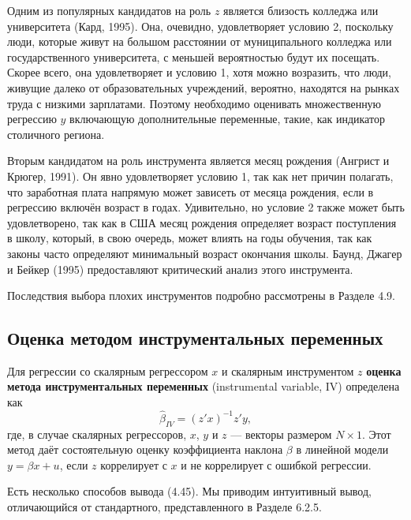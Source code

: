 Одним из популярных кандидатов на роль $z$ является близость колледжа или университета (Кард, 1995). Она, очевидно, удовлетворяет условию 2, поскольку люди, которые живут на большом расстоянии от муниципального колледжа или государственного университета, с меньшей вероятностью будут их посещать. Скорее всего, она удовлетворяет и условию 1, хотя можно возразить, что люди, живущие далеко от образовательных учреждений, вероятно, находятся на рынках труда с низкими зарплатами. Поэтому необходимо оценивать множественную регрессию $y$ включающую дополнительные переменные, такие, как индикатор столичного региона.

Вторым кандидатом на роль инструмента является месяц рождения (Ангрист и Крюгер, 1991). Он явно удовлетворяет условию 1, так как нет причин полагать, что заработная плата напрямую может зависеть от месяца рождения, если в регрессию включён возраст в годах. Удивительно, но условие 2 также может быть удовлетворено, так как в США месяц рождения определяет возраст поступления в школу, который, в свою очередь, может влиять на годы обучения, так как законы часто определяют минимальный возраст окончания школы. Баунд, Джагер и Бейкер (1995) предоставляют критический анализ этого инструмента.

Последствия выбора плохих инструментов подробно рассмотрены в Разделе 4.9.

\subsection{Оценка методом инструментальных переменных}

Для регрессии со скалярным регрессором $x$ и скалярным инструментом $z$ \textbf{оценка метода инструментальных переменных} (instrumental variable, IV) определена как
\begin{equation}
\hat{\beta}_{IV} = (z'x)^{-1}z'y,
\end{equation}
где, в случае скалярных регрессоров, $x$, $y$ и $z$ --- векторы размером $N \times 1$. Этот метод даёт состоятельную оценку коэффициента наклона $\beta$ в линейной модели $y = \beta x +u$, если $z$ коррелирует с $x$ и не коррелирует с ошибкой регрессии.

Есть несколько способов вывода (4.45). Мы приводим интуитивный вывод, отличающийся от стандартного, представленного в Разделе 6.2.5.

